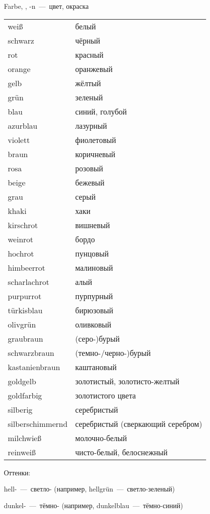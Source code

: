 
 Farbe, \Fall{=}, -n~---~цвет, окраска

\begin{tabular}{|ll|}
\hline
wei\ss & белый \\
schwarz & чёрный \\
rot & красный \\
orange & оранжевый \\
gelb & жёлтый \\
gr\"un & зеленый \\
blau & синий, голубой \\
azurblau & лазурный \\
violett & фиолетовый \\
braun & коричневый \\
rosa & розовый \\
beige & бежевый \\
grau & серый \\
khaki & хаки \\
kirschrot & вишневый \\
weinrot & бордо \\
hochrot & пунцовый \\
himbeerrot & малиновый \\
scharlachrot & алый \\
purpurrot & пурпурный \\
t\"urkisblau & бирюзовый \\
olivgr\"un & оливковый \\
graubraun & (серо-)бурый \\
schwarzbraun & (темно-/черно-)бурый \\
kastanienbraun & каштановый \\
goldgelb & золотистый, золотисто-желтый \\
goldfarbig & золотистого цвета \\
silberig & серебристый \\
silberschimmernd & серебристый (сверкающий серебром) \\
milchwie\ss & молочно-белый \\
reinwei\ss & чисто-белый, белоснежный \\
\hline
\end{tabular}

Оттенки:

hell-~---~светло- (например, hellgr\"un~---~светло-зеленый)

dunkel-~---~тёмно- (например, dunkelblau~---~тёмно-синий)
